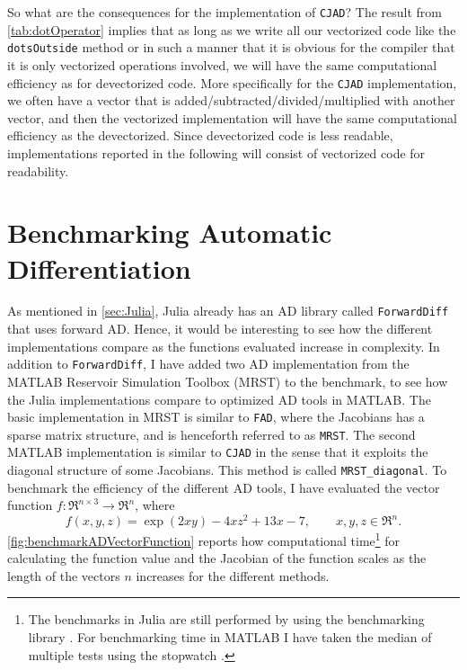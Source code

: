So what are the consequences for the implementation of \texttt{CJAD}? The result from \autoref{tab:dotOperator} implies that as long as we write all our vectorized code like the \texttt{dotsOutside} method or in such a manner that it is obvious for the compiler that it is only vectorized operations involved, we will have the same computational efficiency as for devectorized code. More specifically for the \texttt{CJAD} implementation, we often have a vector that is added/subtracted/divided/multiplied with another vector, and then the vectorized implementation will have the same computational efficiency as the devectorized. Since devectorized code is less readable,  implementations reported in the following will consist of vectorized code for readability.

\section{Benchmarking Automatic Differentiation}
As mentioned in \autoref{sec:Julia}, Julia already has an AD library called \texttt{ForwardDiff} \citep{ForwardDiff} that uses forward AD. Hence, it would be interesting to see how the different implementations compare as the functions evaluated increase in complexity. In addition to \texttt{ForwardDiff}, I have added two AD implementation from the MATLAB Reservoir Simulation Toolbox (MRST) \citep{mrstHomepage} to the benchmark, to see how the Julia implementations compare to optimized AD tools in MATLAB. The basic implementation in MRST is similar to \texttt{FAD}, where the Jacobians has a sparse matrix structure, and is henceforth referred to as \texttt{MRST}. The second MATLAB implementation is similar to \texttt{CJAD} in the sense that it exploits the diagonal structure of some Jacobians. This method is called \texttt{MRST\_diagonal}. To benchmark the efficiency of the different AD tools, I have evaluated the vector function $f: \Re^{n\times 3} \rightarrow \Re^n $, where
\begin{equation}
\label{eq:benchmarkFunction}
f(x,y,z)  = \exp(2xy) - 4xz^2 + 13x - 7, \qquad x,y,z \in \Re^n.
\end{equation}
\autoref{fig:benchmarkADVectorFunction} reports how computational time\footnote{The benchmarks in Julia are still performed by using the benchmarking library \emph{\cite{BenchmarkTools}}. For benchmarking time in MATLAB I have taken the median of multiple tests using the stopwatch \emph{\cite{TicToc}}.} for calculating the function value and the Jacobian of the function scales as the length of the vectors $n$ increases for the different methods.

